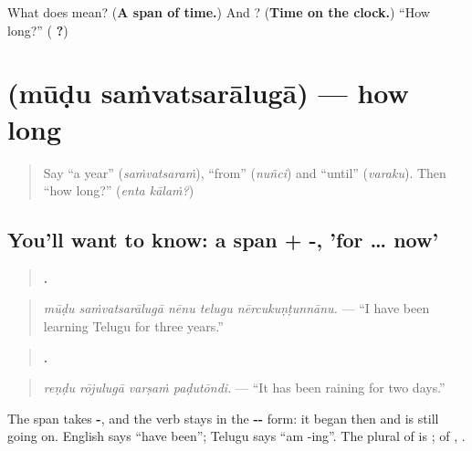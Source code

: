 \begin{tcolorbox}[breakable,colback=teal!4,colframe=teal!35!black,title={Before you move on}]
What does \textbf{} mean? (\textbf{A span of time.}) And \textbf{}? (\textbf{Time on the clock.}) \textquotedblleft{}How long?\textquotedblright{} (\textbf{ ?})
\end{tcolorbox}
\section[\texorpdfstring{\te{మూడు} \te{సంవత్సరాలుగా} (mūḍu saṁvatsarālugā)}{మూడు సంవత్సరాలుగా (mūḍu saṁvatsarālugā)}]{  (mūḍu saṁvatsarālugā) — how long}

\label{lesson:TE-C323-samvatsaraluga}



\begin{quote}
Say \textquotedblleft{}a year\textquotedblright{} (\emph{saṁvatsaraṁ}), \textquotedblleft{}from\textquotedblright{} (\emph{nuñci}) and \textquotedblleft{}until\textquotedblright{} (\emph{varaku}). Then \textquotedblleft{}how long?\textquotedblright{} (\emph{enta kālaṁ?})
\end{quote}

\subsection*{You'll want to know: a span + -, 'for … now'}
\begin{quote}
\textbf{    .}
\end{quote}

\begin{quote}
\emph{mūḍu saṁvatsarālugā nēnu telugu nērcukuṇṭunnānu.} — \textquotedblleft{}I have been learning Telugu for three years.\textquotedblright{}
\end{quote}

\begin{quote}
\textbf{   .}
\end{quote}

\begin{quote}
\emph{reṇḍu rōjulugā varṣaṁ paḍutōndi.} — \textquotedblleft{}It has been raining for two days.\textquotedblright{}
\end{quote}

The span takes \textbf{-}, and the verb stays in the \textbf{--} form: it began then and is still going on. English says \textquotedblleft{}have been\textquotedblright{}; Telugu says \textquotedblleft{}am -ing\textquotedblright{}. The plural of \textbf{} is \textbf{}; of \textbf{}, \textbf{}.

